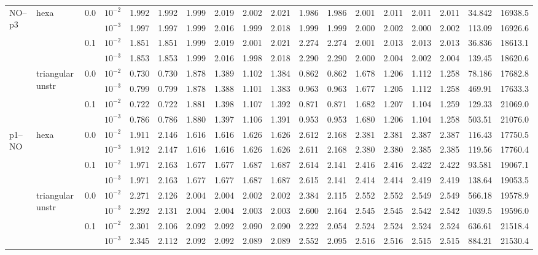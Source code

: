 \begin{longtable}{llclrrrrrrrrrrrrrr}
\multirow{8}{*}{NO--p3} & \multirow{4}{*}{hexa} & \multirow{2}{*}{0.0} & $10^{-2}$ & 1.992 & 1.992 & 1.999 & 2.019 & 2.002 & 2.021 & 1.986 & 1.986 & 2.001 & 2.011 & 2.011 & 2.011 & 34.842 & 16938.5 \\
& & & $10^{-3}$ & 1.997 & 1.997 & 1.999 & 2.016 & 1.999 & 2.018 & 1.999 & 1.999 & 2.000 & 2.002 & 2.000 & 2.002 & 113.09 & 16926.6 \\\cline{3-18}
& & \multirow{2}{*}{0.1} & $10^{-2}$ & 1.851 & 1.851 & 1.999 & 2.019 & 2.001 & 2.021 & 2.274 & 2.274 & 2.001 & 2.013 & 2.013 & 2.013 & 36.836 & 18613.1 \\
& & & $10^{-3}$ & 1.853 & 1.853 & 1.999 & 2.016 & 1.998 & 2.018 & 2.290 & 2.290 & 2.000 & 2.004 & 2.002 & 2.004 & 139.45 & 18620.6 \\\cline{2-18}
& \multirow{4}{*}{triangular unstr} & \multirow{2}{*}{0.0} & $10^{-2}$ & 0.730 & 0.730 & 1.878 & 1.389 & 1.102 & 1.384 & 0.862 & 0.862 & 1.678 & 1.206 & 1.112 & 1.258 & 78.186 & 17682.8 \\
& & & $10^{-3}$ & 0.799 & 0.799 & 1.878 & 1.388 & 1.101 & 1.383 & 0.963 & 0.963 & 1.677 & 1.205 & 1.112 & 1.258 & 469.91 & 17633.3 \\\cline{3-18}
& & \multirow{2}{*}{0.1} & $10^{-2}$ & 0.722 & 0.722 & 1.881 & 1.398 & 1.107 & 1.392 & 0.871 & 0.871 & 1.682 & 1.207 & 1.104 & 1.259 & 129.33 & 21069.0 \\
& & & $10^{-3}$ & 0.786 & 0.786 & 1.880 & 1.397 & 1.106 & 1.391 & 0.953 & 0.953 & 1.680 & 1.206 & 1.104 & 1.258 & 503.51 & 21076.0 \\\hline

\multirow{8}{*}{p1--NO} & \multirow{4}{*}{hexa} & \multirow{2}{*}{0.0} & $10^{-2}$ & 1.911 & 2.146 & 1.616 & 1.616 & 1.626 & 1.626 & 2.612 & 2.168 & 2.381 & 2.381 & 2.387 & 2.387 & 116.43 & 17750.5 \\
& & & $10^{-3}$ & 1.912 & 2.147 & 1.616 & 1.616 & 1.626 & 1.626 & 2.611 & 2.168 & 2.380 & 2.380 & 2.385 & 2.385 & 119.56 & 17760.4 \\\cline{3-18}
& & \multirow{2}{*}{0.1} & $10^{-2}$ & 1.971 & 2.163 & 1.677 & 1.677 & 1.687 & 1.687 & 2.614 & 2.141 & 2.416 & 2.416 & 2.422 & 2.422 & 93.581 & 19067.1 \\
& & & $10^{-3}$ & 1.971 & 2.163 & 1.677 & 1.677 & 1.687 & 1.687 & 2.615 & 2.141 & 2.414 & 2.414 & 2.419 & 2.419 & 138.64 & 19053.5 \\\cline{2-18}
& \multirow{4}{*}{triangular unstr} & \multirow{2}{*}{0.0} & $10^{-2}$ & 2.271 & 2.126 & 2.004 & 2.004 & 2.002 & 2.002 & 2.384 & 2.115 & 2.552 & 2.552 & 2.549 & 2.549 & 566.18 & 19578.9 \\
& & & $10^{-3}$ & 2.292 & 2.131 & 2.004 & 2.004 & 2.003 & 2.003 & 2.600 & 2.164 & 2.545 & 2.545 & 2.542 & 2.542 & 1039.5 & 19596.0 \\\cline{3-18}
& & \multirow{2}{*}{0.1} & $10^{-2}$ & 2.301 & 2.106 & 2.092 & 2.092 & 2.090 & 2.090 & 2.222 & 2.054 & 2.524 & 2.524 & 2.524 & 2.524 & 636.61 & 21518.4 \\
& & & $10^{-3}$ & 2.345 & 2.112 & 2.092 & 2.092 & 2.089 & 2.089 & 2.552 & 2.095 & 2.516 & 2.516 & 2.515 & 2.515 & 884.21 & 21530.4 \\\hline


\end{longtable}
